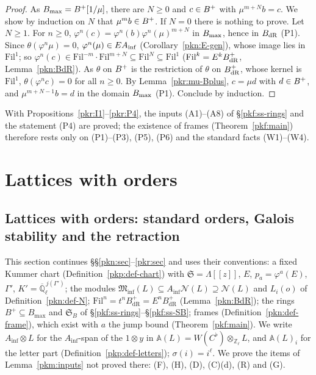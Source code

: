 \documentclass[10pt]{amsart}
\theoremstyle{definition}
\theoremstyle{remark}
\newcommand{\Z}{\mathbb Z}
\newcommand{\Q}{\mathbb Q}
\begin{document}
\begin{proof}
As $\pkfBm=\pkfBp[1/\mu]$, there are $N\ge0$ and $c\in\pkfBp$ with $\mu^{m+N}b=c$. We show by induction
on $N$ that $\mu^mb\in\pkfBp$. If $N=0$ there is nothing to prove. Let $N\ge1$. For $n\ge0$,
$\varphi^n(c)=\varphi^n(b)\varphi^n(\mu)^{m+N}$ in $\pkfBm$, hence in $\pknB$ (P1). Since
$\theta(\varphi^n\mu)=0$, $\varphi^n(\mu)\in E\pkpA$ (Corollary~\ref{pkn:E-gen}), whose image lies in
$\mathrm{Fil}^1$; so $\varphi^n(c)\in\mathrm{Fil}^{-m}\cdot\mathrm{Fil}^{m+N}\subseteq\mathrm{Fil}^N
\subseteq\mathrm{Fil}^1$ ($\mathrm{Fil}^k=E^k\pknBp$, Lemma~\ref{pkn:BdR}). As $\theta$ on $\pkfBp$ is the
restriction of $\theta$ on $\pknBp$, whose kernel is $\mathrm{Fil}^1$, $\theta(\varphi^nc)=0$ for all
$n\ge0$. By Lemma~\ref{pkr:mu-Bplus}, $c=\mu d$ with $d\in\pkfBp$, and $\mu^{m+N-1}b=d$ in the domain
$\pkfBm$ (P1). Conclude by induction.
\end{proof}

With Propositions~\ref{pkr:I1}--\ref{pkr:P4}, the inputs (A1)--(A8) of \S\ref{pkf:ss-rings} and the
statement (P4) are proved; the existence of frames (Theorem~\ref{pkf:main}) therefore rests only on
(P1)--(P3), (P5), (P6) and the standard facts (W1)--(W4).



\section{Lattices with orders}\label{C4:g4}
\providecommand{\auO}{\mathcal O}
\providecommand{\auQlb}{\overline{\Q}_\ell}
\providecommand{\pkpA}{A_{\mathrm{inf}}}
\providecommand{\pkpW}{W(C^\flat)}
\providecommand{\pkpAmb}{\mathbb A}
\providecommand{\pknMinf}{\mathfrak M_{\mathrm{inf}}}
\providecommand{\pknK}{\mathcal K_0}
\providecommand{\pknBp}{B^+_{\mathrm{dR}}}
\providecommand{\pknB}{B_{\mathrm{dR}}}
\providecommand{\pkfBp}{B^+}
\providecommand{\pkfBm}{B_{\max}}
\providecommand{\pkfSB}{\mathfrak S_B}
\providecommand{\pklAN}{\pkpA\mathcal N}
\providecommand{\pklL}{\pkpA\otimes L}
\providecommand{\pklstd}{\mathrm{std}}

\subsection{Lattices with orders: standard orders, Galois stability and the retraction}\label{pkl:sec}

This section continues \S\S\ref{pkn:sec}--\ref{pkr:sec} and uses their conventions: a fixed Kummer
chart (Definition~\ref{pkp:def-chart}) with $\mathfrak S=\Lambda[[z]]$, $E$, $p_a=\varphi^a(E)$, $\Gamma'$,
$K'=\auQlb^{\,j(\Gamma')}$; the modules $\pknMinf(L)\subseteq\pklAN(L)\supseteq\mathcal N(L)$ and
$L_i(o)$ of Definition~\ref{pkn:def-N}; $\mathrm{Fil}^n=t^n\pknBp=E^n\pknBp$ (Lemma~\ref{pkn:BdR}); the
rings $\pkfBp\subseteq\pkfBm$ and $\pkfSB$ of \S\ref{pkf:ss-rings}--\S\ref{pkf:ss-SB}; frames
(Definition~\ref{pkn:def-frame}), which exist with $a$ the jump bound (Theorem~\ref{pkf:main}). We write
$\pklL$ for the $\pkpA$-span of the $1\otimes y$ in $\pkpAmb(L)=\pkpW\otimes_{\Z_\ell}L$, and
$\pkpAmb(L)_i$ for the letter part (Definition~\ref{pkp:def-letters}); $\sigma(i)=i^\ell$. We prove the
items of Lemma~\ref{pkm:inputs} not proved there: (F), (H), (D), (C)(d), (R) and (G).
\end{document}
